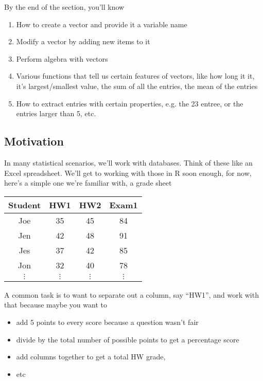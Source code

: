 \documentclass[11pt]{amsart}
\renewcommand{\(}{\left(}
\renewcommand{\)}{\right)}
\begin{document}
By the end of the section, you'll know 
\begin{enumerate}
\item How to create a vector and provide it a variable name
\item Modify a vector by adding new items to it
\item Perform algebra with vectors
\item Various functions that tell us certain features of vectors, like how long it it, it's largest/smallest value, the sum of all the entries, the mean of the entries
\item How to extract entries with certain properties, e.g. the 23 entree, or the entries larger than 5, etc.  
\end{enumerate}

\subsection{Motivation}

In many statistical scenarios, we'll work with databases. Think of these like an Excel
spreadsheet. We'll get to working with those in R soon enough, for 
now, here's a simple one we're familiar with, a grade sheet
\begin{center}
  \begin{tabular}{cccc}
    \textbf{Student} & \textbf{HW1} & \textbf{HW2} & \textbf{Exam1} \\
    \hline\hline
    Joe              & 35 & 45 & 84 \\
    Jen              & 42 & 48 & 91 \\
    Jes              & 37 & 42 & 85 \\
    Jon              & 32 & 40 & 78 \\
    $\vdots$ & $\vdots$ & $\vdots$ & $\vdots$ \\
  \end{tabular}
\end{center}

A common task is to want to separate out a column, say ``HW1'', and
work with that because maybe you want to
\begin{itemize}
\item add 5 points to every score because a question wasn't fair
\item divide by the total number of possible points to get a percentage score
\item add columns together to get a total HW grade,
\item etc
\end{itemize}
\end{document}

